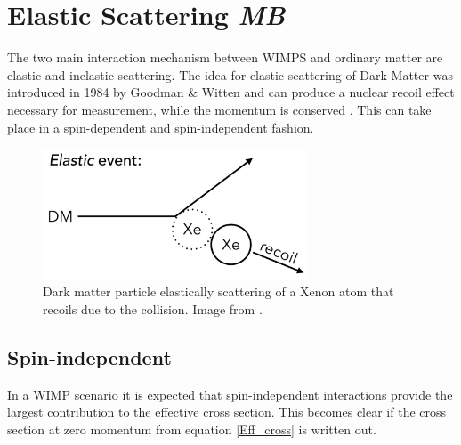 \documentclass{article}
\begin{document}
\FloatBarrier
\newpage
\section{Elastic Scattering \small{\textit{MB}}}
\label{sec:elastic}

The two main interaction mechanism between WIMPS and ordinary matter are elastic and inelastic scattering. The idea for elastic scattering of Dark Matter was introduced in 1984 by Goodman \& Witten \cite{Goodman:1984dc} and can produce a nuclear recoil effect necessary for measurement, while the momentum is conserved \cite{Undagoitia:2015gya, Lewin:1995rx}. This can take place in a spin-dependent and spin-independent fashion. 

\begin{figure}[h]
    \centering
    \includegraphics[width=0.7\textwidth]{Elastic_Scattering.png}
    \caption{Dark matter particle elastically scattering of a Xenon atom that recoils due to the collision. Image from \cite{McCabe:2015eia}.}
    \label{elastic}
\end{figure}


\subsection{Spin-independent} \label{sec:SI}

In a WIMP scenario it is expected that spin-independent interactions provide the largest contribution to the effective cross section. This becomes clear if the cross section at zero momentum from equation \ref{Eff_cross} is written out. 
\end{document}
